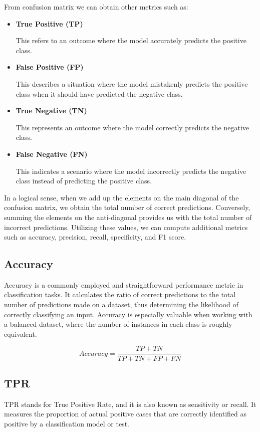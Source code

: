 From confusion matrix we can obtain other metrics such as:

\begin{itemize}
  \item \textbf{True Positive (TP)}

    This refers to an outcome where the model accurately predicts the positive class.
  \item \textbf{False Positive (FP)}

    This describes a situation where the model mistakenly predicts the positive class when it should have predicted the negative class.
  \item \textbf{True Negative (TN)}

    This represents an outcome where the model correctly predicts the negative class.
  \item \textbf{False Negative (FN)}

    This indicates a scenario where the model incorrectly predicts the negative class instead of predicting the positive class.

\end{itemize}


In a logical sense, when we add up the elements on the main diagonal of the
confusion matrix, we obtain the total number of correct predictions.
Conversely, summing the elements on the anti-diagonal provides us with the total
number of incorrect predictions. Utilizing these values, we can compute
additional metrics such as accuracy, precision, recall, specificity, and F1
score.

\subsection{Accuracy}

Accuracy is a commonly employed and straightforward performance metric in
classification tasks. It calculates the ratio of correct predictions to the
total number of predictions made on a dataset, thus determining the likelihood
of correctly classifying an input. Accuracy is especially valuable when working
with a balanced dataset, where the number of instances in each class is roughly
equivalent.

\[Accuracy = \frac{TP + TN}{TP + TN + FP + FN}\]

\subsection{TPR}

TPR stands for True Positive Rate, and it is also known as sensitivity or
recall. It measures the proportion of actual positive cases that are correctly
identified as positive by a classification model or test.

